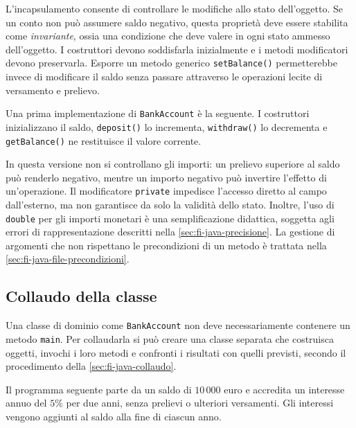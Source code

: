 L'incapsulamento consente di controllare le modifiche
allo stato dell'oggetto. Se un conto non può assumere saldo
negativo, questa proprietà deve essere stabilita come
\emph{invariante}, ossia una condizione che deve valere in ogni
stato ammesso dell'oggetto. I costruttori devono soddisfarla
inizialmente e i metodi modificatori devono preservarla.
Esporre un metodo generico
\texttt{setBalance()} permetterebbe invece di modificare
il saldo senza passare attraverso le operazioni lecite
di versamento e prelievo.

Una prima implementazione di \texttt{BankAccount} è la seguente.
I costruttori inizializzano il saldo, \texttt{deposit()} lo
incrementa, \texttt{withdraw()} lo decrementa e
\texttt{getBalance()} ne restituisce il valore corrente.



\begin{warning}
\label{warn:fi-java-classi-bank-limiti}
In questa versione non si controllano gli importi: un
prelievo superiore al saldo può renderlo negativo, mentre
un importo negativo può invertire l'effetto di un'operazione.
Il modificatore \texttt{private} impedisce l'accesso diretto
al campo dall'esterno, ma non garantisce da solo la validità
dello stato. Inoltre, l'uso di \texttt{double} per gli importi
monetari è una semplificazione didattica, soggetta agli
errori di rappresentazione descritti nella
\cref{sec:fi-java-precisione}. La gestione di argomenti che
non rispettano le precondizioni di un metodo è trattata nella
\cref{sec:fi-java-file-precondizioni}.
\end{warning}

\subsection{Collaudo della classe}
\label{sec:fi-java-classi-collaudo}

Una classe di dominio come \texttt{BankAccount} non deve
necessariamente contenere un metodo \texttt{main}. Per
collaudarla si può creare una classe separata che costruisca
oggetti, invochi i loro metodi e confronti i risultati
con quelli previsti, secondo il procedimento della
\cref{sec:fi-java-collaudo}.

Il programma seguente parte da un saldo di \(10\,000\) euro
e accredita un interesse annuo del \(5\%\) per due anni,
senza prelievi o ulteriori versamenti. Gli interessi
vengono aggiunti al saldo alla fine di ciascun anno.

